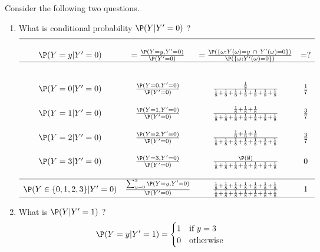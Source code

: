  \begin{classwork}
 Consider the following two questions.
 \begin{enumerate}
\item What is conditional probability $\P(Y|Y'=0)$ ?
 \[
 \begin{array}{c c c c}
 \hline \\
 \P(Y=y | Y'=0) & =\frac{\P(Y=y,Y'=0)}{\P(Y'=0)} & =\frac{\P(\{\omega: Y(\omega)=y \  \cap \ Y'(\omega)=0\})}{\P(\{\omega: Y'(\omega)=0\})} & = ? \\ \hline \\
 \\
 \P(Y=0 | Y'=0) & \frac{\P(Y=0,Y'=0)}{\P(Y'=0)} & \frac{\frac{1}{8}}{\frac{1}{8}+\frac{1}{8}+\frac{1}{8}+\frac{1}{8}+\frac{1}{8}+\frac{1}{8}+\frac{1}{8}} & \frac{1}{7} \\
\\
\P(Y=1 | Y'=0) & \frac{\P(Y=1,Y'=0)}{\P(Y'=0)} & \frac{\frac{1}{8}+\frac{1}{8}+\frac{1}{8}}{\frac{1}{8}+\frac{1}{8}+\frac{1}{8}+\frac{1}{8}+\frac{1}{8}+\frac{1}{8}+\frac{1}{8}} & \frac{3}{7} \\
\\
\P(Y=2 | Y'=0) & \frac{\P(Y=2,Y'=0)}{\P(Y'=0)} & \frac{\frac{1}{8}+\frac{1}{8}+\frac{1}{8}}{\frac{1}{8}+\frac{1}{8}+\frac{1}{8}+\frac{1}{8}+\frac{1}{8}+\frac{1}{8}+\frac{1}{8}} & \frac{3}{7} \\
\\
\P(Y=3 | Y'=0) & \frac{\P(Y=3,Y'=0)}{\P(Y'=0)} & \frac{\P(\emptyset)}{\frac{1}{8}+\frac{1}{8}+\frac{1}{8}+\frac{1}{8}+\frac{1}{8}+\frac{1}{8}+\frac{1}{8}} & 0 \\
\\ \hline
\P(Y \in \{0,1,2,3\} | Y'=0) & \frac{\sum_{y=0}^3{\P(Y=y,Y'=0)}}{\P(Y'=0)} & \frac {\frac{1}{8}+\frac{1}{8}+\frac{1}{8}+\frac{1}{8}+\frac{1}{8}+\frac{1}{8}+\frac{1}{8}}{\frac{1}{8}+\frac{1}{8}+\frac{1}{8}+\frac{1}{8}+\frac{1}{8}+\frac{1}{8}+\frac{1}{8}} & 1 \\ \hline
 \end{array}
 \]
\item What is $\P(Y|Y'=1)$ ?
 \[
\P(Y=y | Y'=1) = 
\begin{cases}
1 & \text{if $y=3$} \\
0 & \text{otherwise}
 \end{cases}
 \]
 \end{enumerate}
 \end{classwork}

